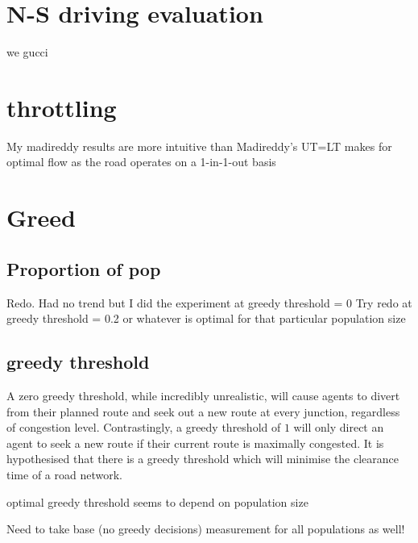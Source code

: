 \section{N-S driving evaluation}

we gucci

\section{throttling}

My madireddy results are more intuitive than Madireddy's
UT=LT makes for optimal flow as the road operates on a 1-in-1-out basis

\section{Greed}

\subsection{Proportion of pop}

Redo. Had no trend but I did the experiment at greedy threshold = 0
Try redo at greedy threshold = 0.2 or whatever is optimal for that particular population size 

\subsection{greedy threshold}
A zero greedy threshold, while incredibly unrealistic, will cause agents to divert from their planned route and seek out a new route at every junction, regardless of congestion level. Contrastingly, a greedy threshold of $1$ will only direct an agent to seek a new route if their current route is maximally congested. It is hypothesised that there is a greedy threshold which will minimise the clearance time of a road network.

optimal greedy threshold seems to depend on population size

Need to take base (no greedy decisions) measurement for all populations as well!
